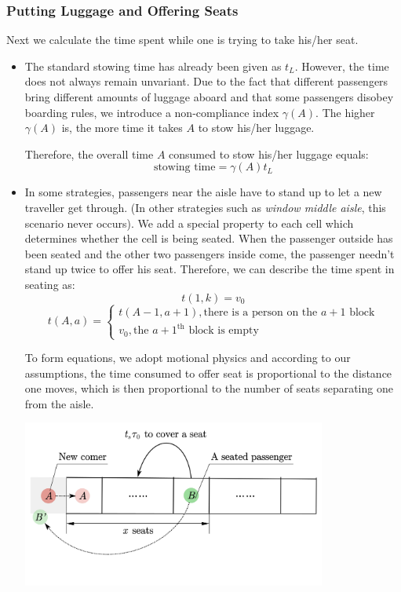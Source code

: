 \documentclass{article}
\theoremstyle{definition}
\theoremstyle{remark}
\numberwithin{equation}{section}
\begin{document}
	\subsubsection{Putting Luggage and Offering Seats}
	Next we calculate the time spent while one is trying to take his/her seat.
	\begin{itemize}
		\item {}

		The standard stowing time has already been given as \(t_L\). However, the time does not always remain unvariant. Due to the fact that different passengers bring different amounts of luggage aboard and that some passengers disobey boarding rules, we introduce a non-compliance index \(\gamma\left(A\right)\). The higher \(\gamma\left(A\right)\) is, the more time it takes \(A\) to stow his/her luggage.

		Therefore, the overall time \(A\) consumed to stow his/her luggage equals:
		\[\text{stowing time}=\gamma \left( A \right) t_L \]
		\item {}

		In some strategies, passengers near the aisle have to stand up to let a new traveller get through. (In other strategies such as \textit{window middle aisle}, this scenario never occurs). We add a special property to each cell which determines whether the cell is being seated. When the passenger outside has been seated and the other two passengers inside come, the passenger needn't stand up twice to offer his seat. Therefore, we can describe the time spent in seating as:
		$$t(1,k)=v_0$$
		$$t(A,a)=\begin{cases}t(A-1,a+1),\text{there is a person on the $a+1$ block}\\v_0, \text{the \(a+1^{\mathrm{th}}\) block is empty}\end{cases}$$

		To form equations, we adopt motional physics and according to our assumptions, the time consumed to offer seat is proportional to the distance one moves, which is then proportional to the number of seats separating one from the aisle.
		\begin{center}
		\includegraphics[width = 10cm]{offering a seat.jpg}


\end{center}
\end{itemize}
\end{document}
